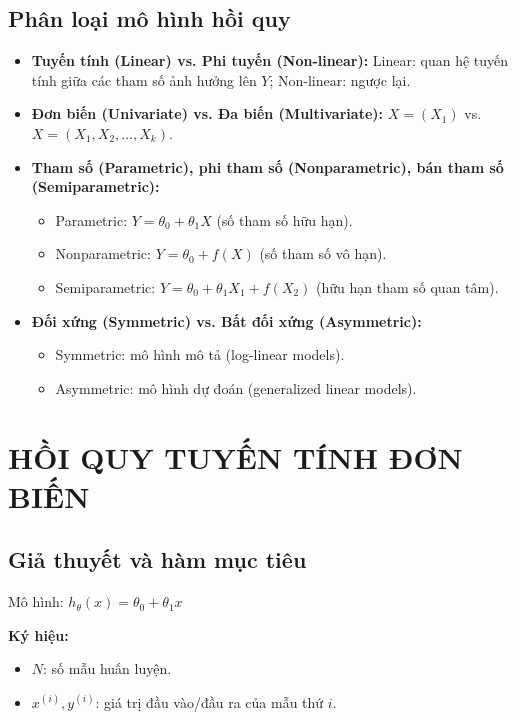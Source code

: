 \documentclass[10pt]{article}
\begin{document}
\subsection{Phân loại mô hình hồi quy}

\begin{itemize}
    \item \textbf{Tuyến tính (Linear) vs. Phi tuyến (Non-linear):} Linear: quan hệ tuyến tính giữa các tham số ảnh hưởng lên $Y$; Non-linear: ngược lại.
    \item \textbf{Đơn biến (Univariate) vs. Đa biến (Multivariate):} $X = (X_1)$ vs. $X = (X_1, X_2, \ldots, X_k)$.
    \item \textbf{Tham số (Parametric), phi tham số (Nonparametric), bán tham số (Semiparametric):}
    \begin{itemize}
        \item Parametric: $Y = \theta_0 + \theta_1 X$ (số tham số hữu hạn).
        \item Nonparametric: $Y = \theta_0 + f(X)$ (số tham số vô hạn).
        \item Semiparametric: $Y = \theta_0 + \theta_1 X_1 + f(X_2)$ (hữu hạn tham số quan tâm).
    \end{itemize}
    \item \textbf{Đối xứng (Symmetric) vs. Bất đối xứng (Asymmetric):}
    \begin{itemize}
        \item Symmetric: mô hình mô tả (log-linear models).
        \item Asymmetric: mô hình dự đoán (generalized linear models).
    \end{itemize}
\end{itemize}

\section{HỒI QUY TUYẾN TÍNH ĐƠN BIẾN}

\subsection{Giả thuyết và hàm mục tiêu}

Mô hình: $h_\theta(x) = \theta_0 + \theta_1 x$

\textbf{Ký hiệu:}
\begin{itemize}
    \item $N$: số mẫu huấn luyện.
    \item $x^{(i)}, y^{(i)}$: giá trị đầu vào/đầu ra của mẫu thứ $i$.
\end{itemize}
\end{document}
